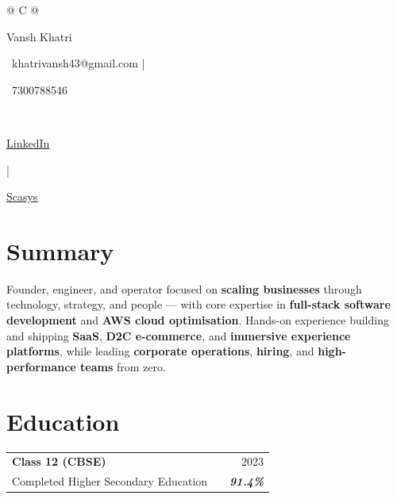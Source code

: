 \documentclass[a4paper,10pt]{article}
\begin{document}
\pagestyle{empty}




\begin{tabularx}{\linewidth}{@{} C @{}}

\color[HTML]{1C033C} \Huge{Vansh Khatri} \\[1pt]



\textcolor[HTML]{371e77}{

\faEnvelope\ khatrivansh43@gmail.com \quad | \quad

\faMobile\ 7300788546

} \\[1pt]



\textcolor[HTML]{371e77}{

\href{https://www.linkedin.com/in/vansh-khatri-3589b1282/}{LinkedIn}

\quad | \quad

\href{https://scasys.in}{Scasys}

}

\end{tabularx}




\section{Summary}

\textcolor[HTML]{1C033C}{

Founder, engineer, and operator focused on \textbf{scaling businesses} through technology, strategy, and people — with core expertise in \textbf{full-stack software development} and \textbf{AWS cloud optimisation}. Hands-on experience building and shipping \textbf{SaaS}, \textbf{D2C e-commerce}, and \textbf{immersive experience platforms}, while leading \textbf{corporate operations}, \textbf{hiring}, and \textbf{high-performance teams} from zero.

}




\section{Education}

\begin{tabularx}{\linewidth}{ @{}l X r@{} }

\color[HTML]{1C033C} \textbf{Class 12 (CBSE)} & \hfill & \color[HTML]{371e77} 2023 \\

\color[HTML]{371e77} Completed Higher Secondary Education & \hfill & \color[HTML]{4B28A4} \textit{\textbf{91.4\%}} \\

\end{tabularx}
\end{document}
